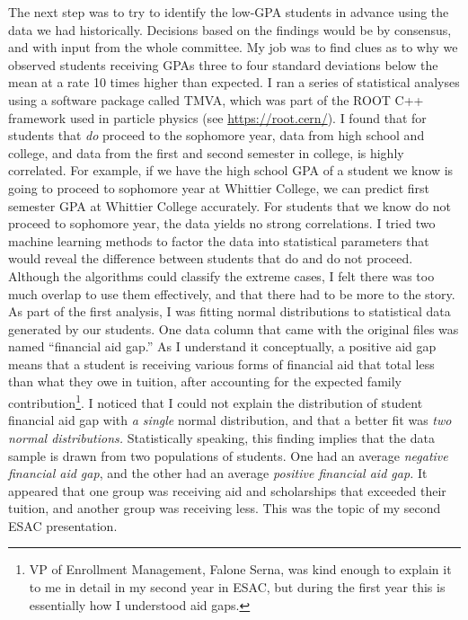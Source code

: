\documentclass[../../../main.tex]{subfiles}
\begin{document}
The next step was to try to identify the low-GPA students in advance using the data we had historically.  Decisions based on the findings would be by consensus, and with input from the whole committee.  My job was to find clues as to why we observed students receiving GPAs three to four standard deviations below the mean at a rate 10 times higher than expected.  I ran a series of statistical analyses using a software package called TMVA, which was part of the ROOT C++ framework used in particle physics (see \url{https://root.cern/}).  I found that for students that \textit{do} proceed to the sophomore year, data from high school and college, and data from the first and second semester in college, is highly correlated.  For example, if we have the high school GPA of a student we know is going to proceed to sophomore year at Whittier College, we can predict first semester GPA at Whittier College accurately.  For students that we know do not proceed to sophomore year, the data yields no strong correlations.  I tried two machine learning methods to factor the data into statistical parameters that would reveal the difference between students that do and do not proceed.  Although the algorithms could classify the extreme cases, I felt there was too much overlap to use them effectively, and that there had to be more to the story.
\\
\vspace{0.25cm}
As part of the first analysis, I was fitting normal distributions to statistical data generated by our students.  One data column that came with the original files was named ``financial aid gap.''  As I understand it conceptually, a positive aid gap means that a student is receiving various forms of financial aid that total less than what they owe in tuition, after accounting for the expected family contribution\footnote{VP of Enrollment Management, Falone Serna, was kind enough to explain it to me in detail in my second year in ESAC, but during the first year this is essentially how I understood aid gaps.}.  I noticed that I could not explain the distribution of student financial aid gap with \textit{a single} normal distribution, and that a better fit was \textit{two normal distributions.}  Statistically speaking, this finding implies that the data sample is drawn from two populations of students.  One had an average \textit{negative financial aid gap}, and the other had an average \textit{positive financial aid gap.}  It appeared that one group was receiving aid and scholarships that exceeded their tuition, and another group was receiving less.  This was the topic of my second ESAC presentation.
\\
\vspace{0.25cm}
\end{document}
